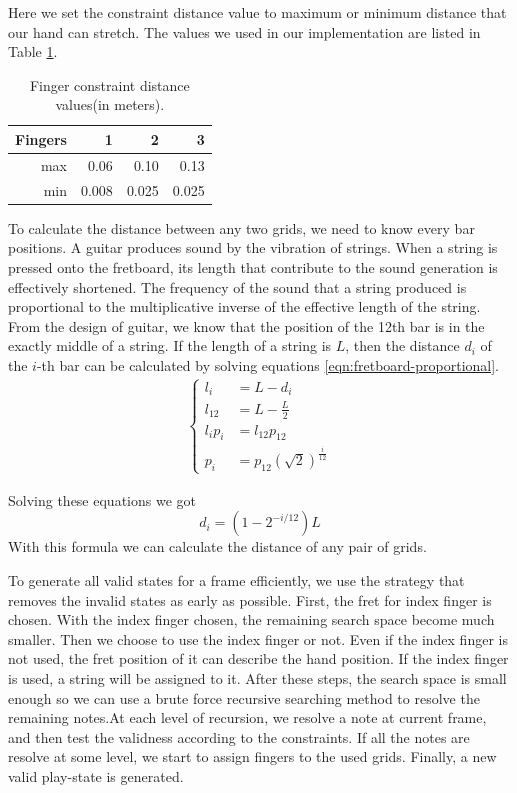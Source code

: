 Here we set the constraint distance value to maximum or minimum distance that our hand can stretch. The values we used in our implementation are listed in Table \ref{table:finger-constraints}.

\begin{table}[h]
    \centering
    \begin{tabular}{r|r|r|r}
        Fingers & 1 & 2 & 3 \\
        \hline
        max & 0.06 & 0.10 & 0.13 \\
        min & 0.008 & 0.025 & 0.025 \\
    \end{tabular}
    \caption{Finger constraint distance values(in meters).}
    \label{table:finger-constraints}
\end{table}

To calculate the distance between any two grids, we need to know every bar positions. A guitar produces sound by the vibration of strings. When a string is pressed onto the fretboard, its length that contribute to the sound generation is effectively shortened. The frequency of the sound that a string produced is proportional to the multiplicative inverse of the effective length of the string. From the design of guitar, we know that the position of the 12th bar is in the exactly middle of a string. If the length of a string is $L$, then the distance $d_i$ of the $i$-th bar can be calculated by solving equations \ref{eqn:fretboard-proportional}.
\begin{eqnarray}
    \left\{
    \begin{aligned}
        l_i &=  L - d_i \\
        l_{12} &=  L - \frac{L}{2} \\
        l_i p_i &=  l_{12} p_{12} \\
        p_i &=  p_{12} (\sqrt{2})^{ \frac{i}{12}}
    \end{aligned}
    \label{eqn:fretboard-proportional}
    \right.
\end{eqnarray}

Solving these equations we got \[ d_i = (1 - 2^{-i/12})L \]
With this formula we can calculate the distance of any pair of grids.

To generate all valid states for a frame efficiently, we use the strategy that removes the invalid states as early as possible. First, the fret for index finger is chosen. With the index finger chosen, the remaining search space become much smaller. Then we choose to use the index finger or not. Even if the index finger is not used, the fret position of it can describe the hand position. If the index finger is used, a string will be assigned to it. After these steps, the search space is small enough so we can use a brute force recursive searching method to resolve the remaining notes.At each level of recursion, we resolve a note at current frame, and then test the validness according to the constraints. If all the notes are resolve at some level, we start to assign fingers to the used grids. Finally, a new valid play-state is generated.

